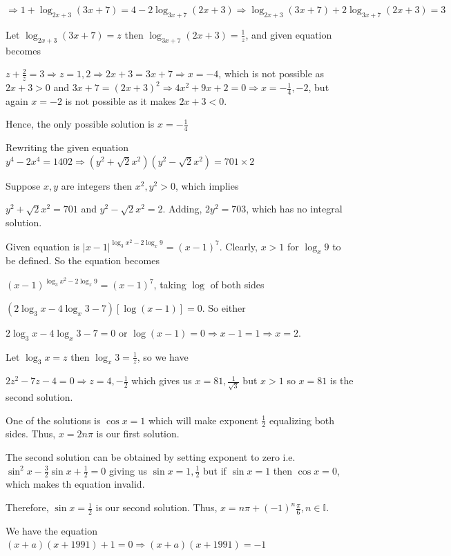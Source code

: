   $\Rightarrow 1 + \log_{2x + 3}(3x + 7) = 4 - 2\log_{3x + 7}(2x + 3)\Rightarrow \log_{2x + 3}(3x + 7) +
  2\log_{3x + 7}(2x + 3) = 3$

  Let $\log_{2x + 3}(3x + 7) = z$ then $\log_{3x + 7}(2x + 3) = \frac{1}{z}$, and given equation becomes

  $z + \frac{2}{z} = 3 \Rightarrow z = 1, 2 \Rightarrow 2x + 3 = 3x + 7 \Rightarrow x = -4$, which is not
  possible as $2x + 3 > 0$ and $3x + 7 = (2x + 3)^2 \Rightarrow 4x^2 + 9x + 2 = 0\Rightarrow x =
  -\frac{1}{4}, -2$, but again $x = -2$ is not possible as it makes $2x + 3 < 0$.

  Hence, the only possible solution is $x = -\frac{1}{4}$
\item Rewriting the given equation $y^4 - 2x^4 = 1402 \Rightarrow (y^2 +\sqrt{2}x^2)(y^2 - \sqrt{2}x^2) =
  701\times2$

  Suppose $x, y$ are integers then $x^2, y^2 > 0$, which implies

  $y^2 + \sqrt{2}x^2 = 701$ and $y^2 - \sqrt{2}x^2 = 2$. Adding, $2y^2 = 703$, which has no integral
  solution.
\item Given equation is $|x - 1|^{\log_3x^2 - 2\log_x9} = (x - 1)^7$. Clearly, $x > 1$ for $\log_x9$ to be
  defined. So the equation becomes

  $(x - 1)^{\log_3x^2 - 2\log_x9} = (x - 1)^7$, taking $\log$ of both sides

  $(2\log_3x - 4\log_x3 - 7)[\log(x - 1)] = 0$. So either

  $2\log_3x - 4\log_x3 - 7 = 0$ or $\log(x - 1) = 0 \Rightarrow x - 1 = 1 \Rightarrow x = 2$.

  Let $\log_3x = z$ then $\log_x3 = \frac{1}{z}$, so we have

  $2z^2 - 7z - 4 = 0 \Rightarrow z = 4, -\frac{1}{2}$ which gives us $x = 81, \frac{1}{\sqrt{3}}$ but $x >
  1$ so $x = 81$ is the second solution.
\item One of the solutions is $\cos x = 1$ which will make exponent $\frac{1}{2}$ equalizing both
  sides. Thus, $x = 2n\pi$ is our first solution.

  The second solution can be obtained by setting exponent to zero i.e. $\sin^2x - \frac{3}{2}\sin x +
  \frac{1}{2} = 0$ giving us $\sin x = 1, \frac{1}{2}$ but if $\sin x = 1$ then $\cos x = 0$, which makes th
  equation invalid.

  Therefore, $\sin x = \frac{1}{2}$ is our second solution. Thus, $x = n\pi + (-1)^n\frac{\pi}{6},
  n\in\mathbb{I}$.
\item We have the equation $(x + a)(x + 1991) + 1 = 0 \Rightarrow (x + a)(x + 1991) = -1$

